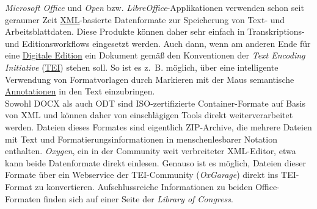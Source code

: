 \documentclass{article}
\begin{document}
    \emph{Microsoft Office} und \emph{Open} bzw. \emph{LibreOffice}-Applikationen verwenden schon seit geraumer Zeit \href{http://gams.uni-graz.at/o:konde.215}{XML}-basierte Datenformate zur Speicherung von Text- und Arbeitsblattdaten. Diese Produkte können daher sehr einfach in Transkriptions- und Editionsworkflows eingesetzt werden. Auch dann, wenn am anderen Ende für eine \href{http://gams.uni-graz.at/o:konde.59}{Digitale Edition} ein Dokument gemäß den Konventionen der \emph{Text Encoding Initiative} (\href{http://gams.uni-graz.at/o:konde.178}{TEI}) stehen soll. So ist es z. B. möglich, über eine intelligente Verwendung von Formatvorlagen durch Markieren mit der Maus semantische \href{http://gams.uni-graz.at/o:konde.17}{Annotationen} in den Text einzubringen.\\
            
        Sowohl DOCX als auch ODT sind ISO-zertifizierte Container-Formate auf Basis von XML und können daher von einschlägigen Tools direkt weiterverarbeitet werden. Dateien dieses Formates sind eigentlich ZIP-Archive, die mehrere Dateien mit Text und Formatierungsinformationen in menschenlesbarer Notation enthalten. \emph{Oxygen}, ein in der Community weit verbreiteter XML-Editor, etwa kann beide Datenformate direkt einlesen. Genauso ist es möglich, Dateien dieser Formate über ein Webservice der TEI-Community (\emph{OxGarage}) direkt ins TEI-Format zu konvertieren. Aufschlussreiche Informationen zu beiden Office-Formaten finden sich auf einer Seite der\emph{ Library of Congress}.\\
            
\end{document}
